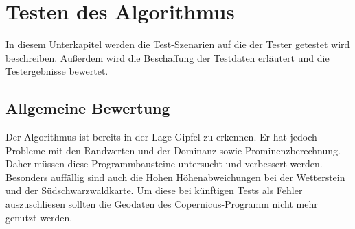 \section{Testen des Algorithmus}\label{sec:testen_des_algorithmus}
In diesem Unterkapitel werden die Test-Szenarien auf die der Tester getestet wird beschreiben. Außerdem wird die Beschaffung der Testdaten erläutert und die Testergebnisse bewertet. 

\subsection{Allgemeine Bewertung}\label{subsec:allgemeine_bewertung_testen}
Der Algorithmus ist bereits in der Lage Gipfel zu erkennen. Er hat jedoch Probleme mit den Randwerten und der Dominanz sowie Prominenzberechnung. Daher müssen diese Programmbausteine untersucht und verbessert werden. Besonders auffällig sind auch die Hohen Höhenabweichungen bei der Wetterstein und der Südschwarzwaldkarte. Um diese bei künftigen Tests als Fehler auszuschliesen sollten die Geodaten des Copernicus-Programm nicht mehr genutzt werden.

